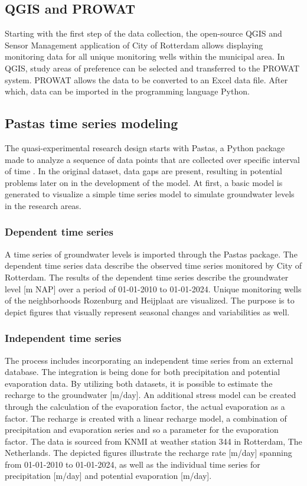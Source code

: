 \subsection{QGIS and PROWAT}
Starting with the first step of the data collection, the open-source QGIS and Sensor Management application of City of Rotterdam allows displaying monitoring data for all unique monitoring wells within the municipal area. In QGIS, study areas of preference can be selected and transferred to the PROWAT system. PROWAT allows the data to be converted to an Excel data file. After which, data can be imported in the programming language Python.

\subsection{Pastas time series modeling}
The quasi-experimental research design starts with Pastas, a Python package made to analyze a sequence of data points that are collected over specific interval of time \cite{collenteur-2019}. In the original dataset, data gaps are present, resulting in potential problems later on in the development of the model. At first, a basic model is generated to visualize a simple time series model to simulate groundwater levels in the research areas.

\subsubsection{Dependent time series}
A time series of groundwater levels is imported through the Pastas package. The dependent time series data describe the observed time series monitored by City of Rotterdam. The results of the dependent time series describe the groundwater level [m NAP] over a period of 01-01-2010 to 01-01-2024. Unique monitoring wells of the neighborhoods Rozenburg and Heijplaat are visualized. The purpose is to depict figures that visually represent seasonal changes and variabilities as well. 

\subsubsection{Independent time series}
The process includes incorporating an independent time series from an external database. The integration is being done for both precipitation and potential evaporation data. By utilizing both datasets, it is possible to estimate the recharge to the groundwater [m/day]. An additional stress model can be created through the calculation of the evaporation factor, the actual evaporation as a factor. The recharge is created with a linear recharge model, a combination of precipitation and evaporation series and so a parameter for the evaporation factor. The data is sourced from KNMI at weather station 344 in Rotterdam, The Netherlands. The depicted figures illustrate the recharge rate [m/day] spanning from 01-01-2010 to 01-01-2024, as well as the individual time series for precipitation [m/day] and potential evaporation [m/day].

